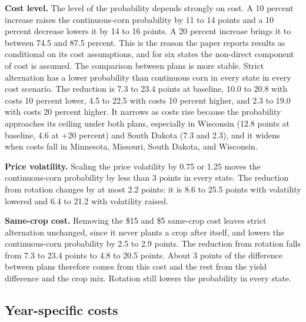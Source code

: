 \documentclass[11pt,letterpaper]{article}
\theoremstyle{remark}
\begin{document}
\begin{table}[H]
\centering
\caption{Annual breakeven probability under changes in one input at a time, medium zone. Cost $\pm$ changes the level of total non-land cost for both crops; Vol.\ multiplies the log standard deviation of prices; No penalty sets the same-crop cost to zero.}
\label{tab:rob_inputs}
\footnotesize
\setlength{\tabcolsep}{4pt}

\end{table}

\textbf{Cost level.} The level of the probability depends strongly on cost. A 10 percent increase raises the continuous-corn probability by 11 to 14 points and a 10 percent decrease lowers it by 14 to 16 points. A 20 percent increase brings it to between 74.5 and 87.5 percent. This is the reason the paper reports results as conditional on its cost assumptions, and for six states the non-direct component of cost is assumed. The comparison between plans is more stable. Strict alternation has a lower probability than continuous corn in every state in every cost scenario. The reduction is 7.3 to 23.4 points at baseline, 10.0 to 20.8 with costs 10 percent lower, 4.5 to 22.5 with costs 10 percent higher, and 2.3 to 19.0 with costs 20 percent higher. It narrows as costs rise because the probability approaches its ceiling under both plans, especially in Wisconsin (12.8 points at baseline, 4.6 at $+20$ percent) and South Dakota (7.3 and 2.3), and it widens when costs fall in Minnesota, Missouri, South Dakota, and Wisconsin.

\textbf{Price volatility.} Scaling the price volatility by 0.75 or 1.25 moves the continuous-corn probability by less than 3 points in every state. The reduction from rotation changes by at most 2.2 points: it is 8.6 to 25.5 points with volatility lowered and 6.4 to 21.2 with volatility raised.

\textbf{Same-crop cost.} Removing the \$15 and \$5 same-crop cost leaves strict alternation unchanged, since it never plants a crop after itself, and lowers the continuous-corn probability by 2.5 to 2.9 points. The reduction from rotation falls from 7.3 to 23.4 points to 4.8 to 20.5 points. About 3 points of the difference between plans therefore comes from this cost and the rest from the yield difference and the crop mix. Rotation still lowers the probability in every state.

\subsection{\label{subsec:cost_timing}Year-specific costs}
\end{document}
